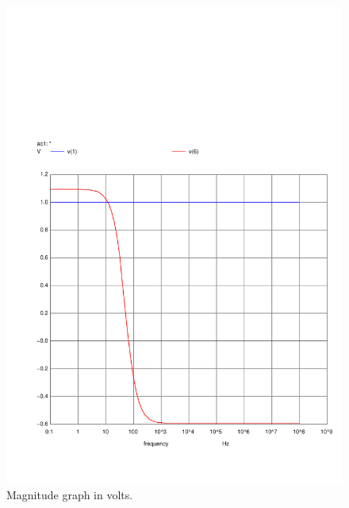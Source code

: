 \begin{figure}[H] \centering
    \includegraphics[width=0.9\linewidth]{../Simulation/acm.pdf}
    \caption{Magnitude graph in volts.}
    \label{fig:FreqMagNg}
\end{figure}


